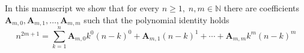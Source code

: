 In this manuscript we show that for every $n\geq 1, \; n,m\in\mathbb{N}$
there are coefficients $\mathbf{A}_{m,0}, \mathbf{A}_{m,1}, \ldots, \mathbf{A}_{m,m}$ such that
the polynomial identity holds
\[
    n^{2m+1} = \sum_{k=1}^{n} \mathbf{A}_{m,0} k^0 (n-k)^0 + \mathbf{A}_{m,1}(n-k)^1
    + \cdots + \mathbf{A}_{m,m} k^m (n-k)^m
\]
